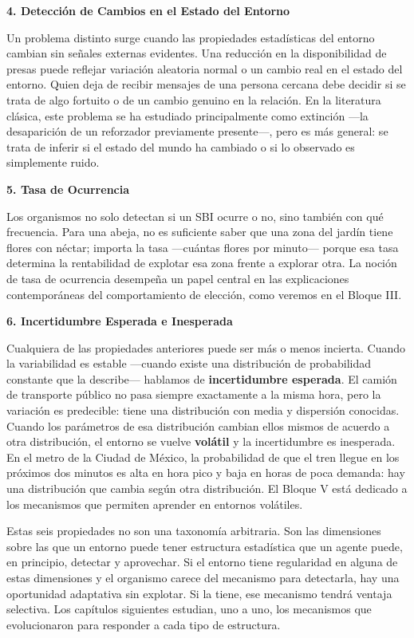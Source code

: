 \documentclass[
  letterpaper,
  DIV=11,
  numbers=noendperiod]{scrreprt}
\begin{document}
\textbf{4. Detección de Cambios en el Estado del Entorno}

Un problema distinto surge cuando las propiedades estadísticas del
entorno cambian sin señales externas evidentes. Una reducción en la
disponibilidad de presas puede reflejar variación aleatoria normal o un
cambio real en el estado del entorno. Quien deja de recibir mensajes de
una persona cercana debe decidir si se trata de algo fortuito o de un
cambio genuino en la relación. En la literatura clásica, este problema
se ha estudiado principalmente como extinción ---la desaparición de un
reforzador previamente presente---, pero es más general: se trata de
inferir si el estado del mundo ha cambiado o si lo observado es
simplemente ruido.

\textbf{5. Tasa de Ocurrencia}

Los organismos no solo detectan si un SBI ocurre o no, sino también con
qué frecuencia. Para una abeja, no es suficiente saber que una zona del
jardín tiene flores con néctar; importa la tasa ---cuántas flores por
minuto--- porque esa tasa determina la rentabilidad de explotar esa zona
frente a explorar otra. La noción de tasa de ocurrencia desempeña un
papel central en las explicaciones contemporáneas del comportamiento de
elección, como veremos en el Bloque III.

\textbf{6. Incertidumbre Esperada e Inesperada}

Cualquiera de las propiedades anteriores puede ser más o menos incierta.
Cuando la variabilidad es estable ---cuando existe una distribución de
probabilidad constante que la describe--- hablamos de
\textbf{incertidumbre esperada}. El camión de transporte público no pasa
siempre exactamente a la misma hora, pero la variación es predecible:
tiene una distribución con media y dispersión conocidas. Cuando los
parámetros de esa distribución cambian ellos mismos de acuerdo a otra
distribución, el entorno se vuelve \textbf{volátil} y la incertidumbre
es inesperada. En el metro de la Ciudad de México, la probabilidad de
que el tren llegue en los próximos dos minutos es alta en hora pico y
baja en horas de poca demanda: hay una distribución que cambia según
otra distribución. El Bloque V está dedicado a los mecanismos que
permiten aprender en entornos volátiles.

Estas seis propiedades no son una taxonomía arbitraria. Son las
dimensiones sobre las que un entorno puede tener estructura estadística
que un agente puede, en principio, detectar y aprovechar. Si el entorno
tiene regularidad en alguna de estas dimensiones y el organismo carece
del mecanismo para detectarla, hay una oportunidad adaptativa sin
explotar. Si la tiene, ese mecanismo tendrá ventaja selectiva. Los
capítulos siguientes estudian, uno a uno, los mecanismos que
evolucionaron para responder a cada tipo de estructura.
\end{document}
